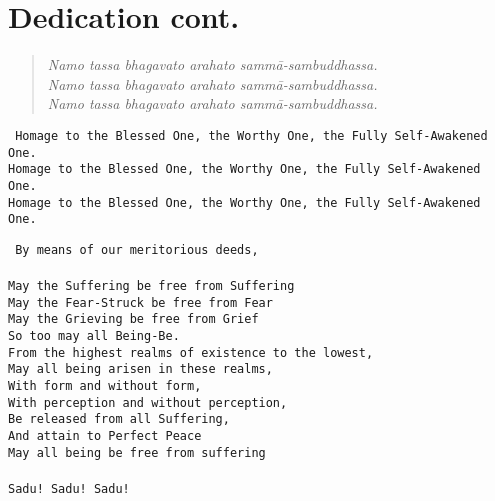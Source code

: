 \clearpage
\section*{Dedication cont.}
\label{namo}
\thispagestyle{plain}
\begin{quote}
    \emph{Namo tassa bhagavato arahato sammā-sambuddhassa.} \\
    \emph{Namo tassa bhagavato arahato sammā-sambuddhassa.} \\
    \emph{Namo tassa bhagavato arahato sammā-sambuddhassa.} \\
\end{quote}

\vspace{1cm}

\texttt{
Homage to the Blessed One, the Worthy One, the Fully Self-Awakened One.\\
Homage to the Blessed One, the Worthy One, the Fully Self-Awakened One.\\
Homage to the Blessed One, the Worthy One, the Fully Self-Awakened One.
}

\vspace{1cm}

\texttt{
By means of our meritorious deeds,\\
\\
May the Suffering be free from Suffering\\
May the Fear-Struck be free from Fear\\
May the Grieving be free from Grief\\
So too may all Being-Be.\\
From the highest realms of existence to the lowest,\\
May all being arisen in these realms,\\
With form and without form,\\
With perception and without perception,\\
Be released from all Suffering,\\
And attain to Perfect Peace\\
May all being be free from suffering\\
\\
Sadu! Sadu! Sadu!
}
